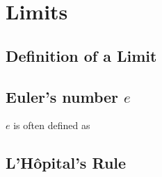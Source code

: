 \section{Limits}

\subsection{Definition of a Limit}

\subsection[Euler's number \texorpdfstring{\(e\)}{e}]
           {Euler's number \boldmath\(e\)} \label{sec_e}

\(e\) is often defined as

\subsection{L'H\^opital's Rule}
